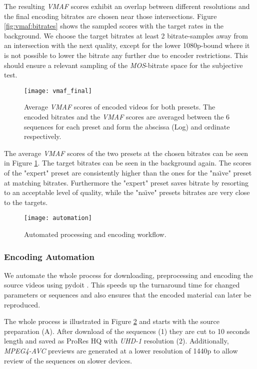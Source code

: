 The resulting \textit{VMAF} scores exhibit an overlap between different resolutions and the final encoding bitrates are chosen near those intersections. Figure \ref{fig:vmaf:bitrates} shows the sampled scores with the target rates in the background. We choose the target bitrates at least 2 bitrate-samples away from an intersection with the next quality, except for the lower 1080p-bound where it is not possible to lower the bitrate any further due to encoder restrictions. This should ensure a relevant sampling of the \textit{MOS}-bitrate space for the subjective test.

\begin{figure}[htb!]
	\centering
	\texttt{[image: vmaf\_final]}
	\caption{Average \textit{VMAF} scores of encoded videos for both presets. The encoded bitrates and the \textit{VMAF} scores are averaged between the 6 sequences for each preset and form the abscissa (Log) and ordinate respectively.}
	\label{fig:vmaf:encoded}
\end{figure}

The average \textit{VMAF} scores of the two presets at the chosen bitrates can be seen in Figure \ref{fig:vmaf:encoded}. The target bitrates can be seen in the background again. The scores of the "expert" preset are consistently higher than the ones for the "na\"{\i}ve" preset at matching bitrates. Furthermore the "expert" preset saves bitrate by resorting to an acceptable level of quality, while the "na\"{\i}ve" presets bitrates are very close to the targets.


\begin{figure}[bht!]
	\centering
	\texttt{[image: automation]}
	\caption{Automated processing and encoding workflow.}
	\label{fig:automation}
\end{figure}

\subsubsection{Encoding Automation}
We automate the whole process for downloading, preprocessing and encoding the source videos using pydoit \cite{web:pydoit}. This speeds up the turnaround time for changed parameters or sequences and also ensures that the encoded material can later be reproduced.

The whole process is illustrated in Figure \ref{fig:automation} and starts with the source preparation (A). After download of the sequences (1) they are cut to 10 seconds length and saved as ProRes HQ with \textit{UHD-1} resolution (2). Additionally, \textit{MPEG4-AVC} previews are generated at a lower resolution of 1440p to allow review of the sequences on slower devices.

